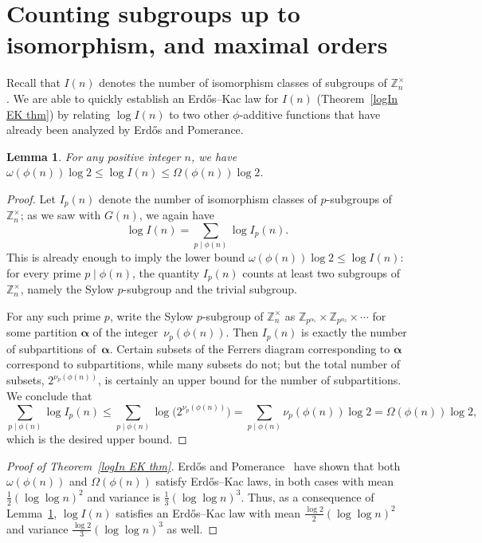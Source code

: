 \documentclass[12pt,reqno]{amsart}
\newtheorem{lemma}[theorem]{Lemma}
\theoremstyle{definition}
\newcommand{\Z}{{\mathbb Z}}
\newcommand{\Znt}{{\Z_n^\times}}
\newcommand{\balpha}{{\bm\alpha}}
\begin{document}
\section{Counting subgroups up to isomorphism, and maximal orders}\label{max order section}

Recall that $I(n)$ denotes the number of isomorphism classes of subgroups of $\Znt$. We are able to quickly establish an Erd{\H o}s--Kac law for $I(n)$ (Theorem~\ref{logIn EK thm}) by relating $\log I(n)$ to two other $\phi$-additive functions that have already been analyzed by Erd{\H o}s and Pomerance.

\begin{lemma}  \label{log In bounds lemma}
For any positive integer $n$, we have $\omega(\phi(n)) \log 2 \leq \log I(n) \leq \Omega(\phi(n)) \log 2$.
\end{lemma}

\begin{proof}
Let $I_p(n)$ denote the number of isomorphism classes of $p$-subgroups of $\Znt$; as we saw with $G(n)$, we again have
\[
\log I(n) = \sum_{p \mid \phi(n)} \log I_p(n).
\]
This is already enough to imply the lower bound $\omega(\phi(n)) \log 2 \leq \log I(n)$: for every prime $p\mid\phi(n)$, the quantity $I_p(n)$ counts at least two subgroups of $\Znt$, namely the Sylow $p$-subgroup and the trivial subgroup.

For any such prime $p$, write the Sylow $p$-subgroup of $\Znt$ as $\Z_{p^{\alpha_1}} \times \Z_{p^{\alpha_2}} \times \cdots$ for some partition $\balpha$ of the integer~$\nu_p(\phi(n))$. Then $I_p(n)$ is exactly the number of subpartitions of~$\balpha$. Certain subsets of the Ferrers diagram corresponding to $\balpha$ correspond to subpartitions, while many subsets do not; but the total number of subsets, $2^{\nu_p(\phi(n))}$, is certainly an upper bound for the number of subpartitions. We conclude that
\begin{equation}  \label{wasteful?}
\sum_{p \mid \phi(n)} \log I_p(n) \leq \sum_{p \mid \phi(n)} \log \big( 2^{\nu_p(\phi(n))} \big) = \sum_{p \mid \phi(n)} {\nu_p(\phi(n))} \log2 = \Omega(\phi(n)) \log 2,
\end{equation}
which is the desired upper bound.
\end{proof}

\begin{proof}[Proof of Theorem~\ref{logIn EK thm}]
Erd{\H o}s and Pomerance~\cite{ep85} have shown that both $\omega(\phi(n))$ and $\Omega(\phi(n))$ satisfy Erd{\H o}s--Kac laws, in both cases with mean $\frac{1}{2} (\log\log n)^2$ and variance is $\frac{1}{3} (\log\log n)^3$. Thus, as a consequence of Lemma~\ref{log In bounds lemma}, $\log I(n)$ satisfies an Erd{\H o}s--Kac law with mean $\frac{\log 2}{2} (\log\log n)^2$ and variance $\frac{\log 2}{3} (\log\log n)^3$ as well.
\end{proof}
\end{document}
